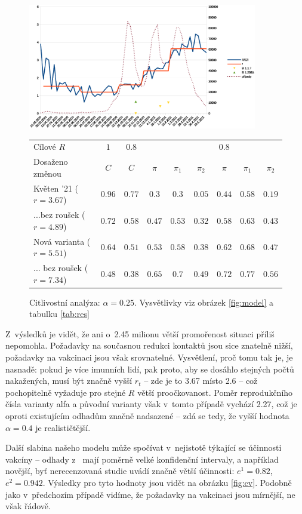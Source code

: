 \begin{figure}
\begin{center}
\includegraphics[width=10cm]{pic/whole4}
						 

\begin{tabular}{l|c|c|ccc|ccc}									
Cílové $R$	& $1$	& $0.8$	&	&	&	& $0.8$	&	&	\\ 
Dosaženo změnou	& $C$	& $C$	& $\pi$	& $\pi_1$	& $\pi_2$	& $\pi$	& $\pi_1$	& $\pi_2$	\\ \hline
Květen '21 ($r=3.67$)	& $0.96$	& $0.77$	& $0.3$	& $0.3$	& $0.05$	& $0.44$	& $0.58$	& $0.19$	\\
...bez roušek ($r=4.89$)	& $0.72$	& $0.58$	& $0.47$	& $0.53$	& $0.32$	& $0.58$	& $0.63$	& $0.43$	\\
Nová varianta ($r=5.51$)	& $0.64$	& $0.51$	& $0.53$	& $0.58$	& $0.38$	& $0.62$	& $0.68$	& $0.47$	\\
... bez roušek ($r=7.34$)	& $0.48$	& $0.38$	& $0.65$	& $0.7$	& $0.49$	& $0.72$	& $0.77$	& $0.56$	
\end{tabular}									


\caption{Citlivostní analýza: $\alpha=0.25$. Vysvětlivky viz obrázek \ref{fig:model} a tabulku \ref{tab:res}}
\label{fig:calpha}
\end{center}
\end{figure}
Z~výsledků je vidět, že ani o~2.45 milionu větší promořenost situaci příliš
nepomohla. Požadavky na současnou redukci kontaktů jsou sice znatelně
nižší, požadavky na vakcinaci jsou však srovnatelné. Vysvětlení, proč
tomu tak je, je nasnadě: pokud je více imunních lidí, pak proto,
aby se dosáhlo stejných počtů nakažených, musí být značně vyšší $r_{t}$
-- zde je to 3.67 místo 2.6 -- což pochopitelně vyžaduje pro stejné $R$
větší proočkovanost. Poměr reprodukčního čísla varianty alfa a
původní varianty však v~tomto případě vychází 2.27, což je oproti
existujícím odhadům značně nadsazené -- zdá se tedy, že vyšší hodnota
$\alpha=0.4$ je realističtější.

Další slabina našeho modelu může spočívat v~nejistotě týkající se účinnosti vakcíny
-- odhady z~\cite{Hall_etal2021} mají poměrně velké konfidenční
intervaly, a například novější, byť nerecenzovaná studie \cite{Shapiro_etal2021}
uvádí značně větší účinnosti: $e^{1}=0.82$, $e^{2}=0.942$. Výsledky pro tyto hodnoty jsou vidět na obrázku \ref{fig:cv}. Podobně jako v~předchozím případě vidíme, že požadavky na vakcinaci jsou mírnější, ne však řádově.

